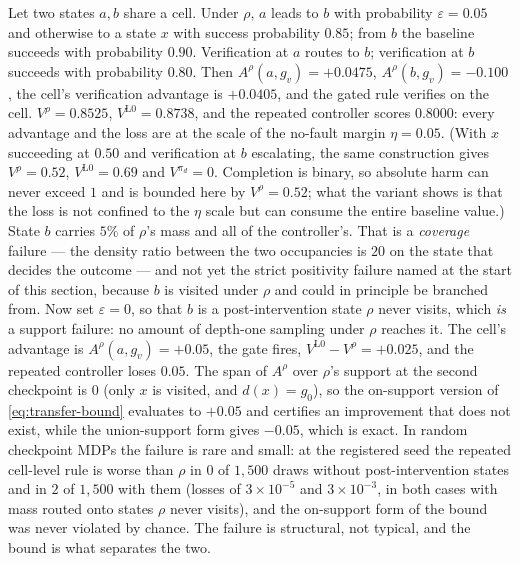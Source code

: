 \begin{remark}
\label{rem:transfer-fails}
Let two states $a,b$ share a cell.  Under $\rho$, $a$ leads to $b$ with
probability $\varepsilon=0.05$ and otherwise to a state $x$ with success
probability $0.85$; from $b$ the baseline succeeds with probability $0.90$.
Verification at $a$ routes to $b$; verification at $b$ succeeds with
probability $0.80$.  Then $A^\rho(a,g_v)=+0.0475$, $A^\rho(b,g_v)=-0.100$,
the cell's verification advantage is $+0.0405$, and the gated rule verifies on
the cell.  $V^\rho=0.8525$, $V^{\mathrm{L0}}=0.8738$, and the repeated
controller scores $0.8000$: every advantage and the loss are at the scale of
the no-fault margin $\eta=0.05$.  (With $x$ succeeding at $0.50$ and
verification at $b$ escalating, the same construction gives $V^\rho=0.52$,
$V^{\mathrm{L0}}=0.69$ and $V^{\pi_d}=0$.  Completion is binary, so absolute
harm can never exceed $1$ and is bounded here by $V^\rho=0.52$; what the variant
shows is that the loss is not confined to the $\eta$ scale but can consume the
entire baseline value.)  State $b$ carries $5\%$ of $\rho$'s mass and all of the
controller's.  That is a \emph{coverage} failure --- the density ratio between
the two occupancies is $20$ on the state that decides the outcome --- and not
yet the strict positivity failure named at the start of this section, because
$b$ is visited under $\rho$ and could in principle be branched from.  Now
set $\varepsilon=0$, so that $b$ is a post-intervention state $\rho$ never
visits, which \emph{is} a support failure: no amount of depth-one sampling
under $\rho$ reaches it.  The cell's advantage is $A^\rho(a,g_v)=+0.05$, the gate fires,
$V^{\mathrm{L0}}-V^\rho=+0.025$, and the repeated controller loses $0.05$.
The span of $A^\rho$ over $\rho$'s support at the second checkpoint is $0$
(only $x$ is visited, and $d(x)=g_0$), so the on-support version of
\eqref{eq:transfer-bound} evaluates to $+0.05$ and certifies an improvement
that does not exist, while the union-support form gives $-0.05$, which is
exact.  In random checkpoint MDPs the failure is rare and small: at the
registered seed the repeated cell-level rule is worse than $\rho$ in $0$ of
$1{,}500$ draws without post-intervention states and in $2$ of $1{,}500$ with
them (losses of $3\times10^{-5}$ and $3\times10^{-3}$, in both cases with
mass routed onto states $\rho$ never visits), and the on-support form of the
bound was never violated by chance.  The failure is structural, not typical,
and the bound is what separates the two.
\end{remark}
